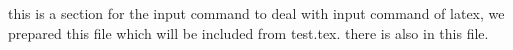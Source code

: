 \begin{section}{this is a section for the input command}
    to deal with input command of latex, we prepared this file which will be included from test.tex. there is   also in this file.
\end{section}